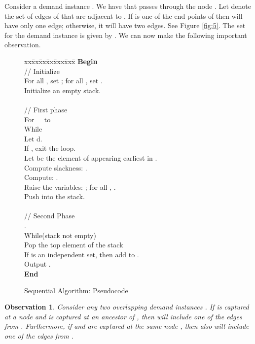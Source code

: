 \documentclass[11pt]{article}
\newtheorem{observation}[theorem]{\bf Observation}
\begin{document}
Consider a demand instance . 
We have that  passes through the node . 
Let  denote the set of edges of  that are adjacent to .
If  is one of the end-points of  then  will have only one edge;
otherwise, it will have two edges. 
See Figure \ref{fig:5}. The set  for the demand instance 
is given by .
We can now make the following important observation.

\begin{figure}[t!]
\begin{center}
\begin{boxedminipage}{\hsize}
\begin{small}
\begin{tabbing}
xx\=xx\=xx\=xx\=xxx\=xxx\=\kill
\textbf{Begin}  \\
\> // Initialize \\
\> For all , set ; for all , set .\\
\> Initialize an empty stack.\\
\>\\
\> // First phase\\
\> For  =  to \\
\> \> While\\
\> \> \>Let d.\\
\> \> \>If , exit the loop.\\
\> \> \>Let  be the element of  appearing earliest in .\\
\> \> \>Compute slackness: .\\
\> \> \>Compute: .\\
\> \> \>Raise the variables: ; 
          for all , .\\
\> \> \>Push  into the stack.\\
\>\\
\> // Second Phase\\
\> \> .\\
\> \> While(stack not empty)\\
\> \> \> Pop the top element  of the stack\\
\> \> \> If  is an independent set, then add  to .\\
\> Output .\\
\textbf{End}
\end{tabbing}
\end{small}
\end{boxedminipage}
\end{center}
\caption{Sequential Algorithm: Pseudocode}
\label{fig:Lewin-pseudo}
\end{figure}

\begin{observation}
\label{obs:AAA}
Consider any two overlapping demand instances .
If  is captured at a node  and  is captured at an ancestor of ,
then  will include one of the edges from .
Furthermore, if  and  are captured at the same node ,
then also  will include one of the edges from .
\end{observation}
\end{document}

